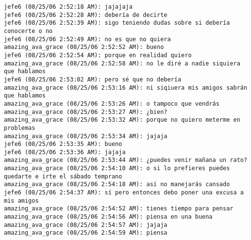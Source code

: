 \begin{verbatim}
jefe6 (08/25/06 2:52:18 AM): jajajaja
jefe6 (08/25/06 2:52:28 AM): debería de decirte
jefe6 (08/25/06 2:52:39 AM): sigo teniendo dudas sobre si debería conocerte o no
jefe6 (08/25/06 2:52:49 AM): no es que no quiera
amazing_ava_grace (08/25/06 2:52:52 AM): bueno
jefe6 (08/25/06 2:52:54 AM): porque en realidad quiero
amazing_ava_grace (08/25/06 2:52:58 AM): no le diré a nadie siquiera que hablamos
jefe6 (08/25/06 2:53:02 AM): pero sé que no debería
amazing_ava_grace (08/25/06 2:53:16 AM): ni siqiuera mis amigos sabrán que hablamos
amazing_ava_grace (08/25/06 2:53:26 AM): o tampoco que vendrás
amazing_ava_grace (08/25/06 2:53:27 AM): ¿bien?
amazing_ava_grace (08/25/06 2:53:32 AM): porque no quiero meterme en problemas
amazing_ava_grace (08/25/06 2:53:34 AM): jajaja
jefe6 (08/25/06 2:53:35 AM): bueno
jefe6 (08/25/06 2:53:36 AM): jajaja
amazing_ava_grace (08/25/06 2:53:44 AM): ¿puedes venir mañana un rato?
amazing_ava_grace (08/25/06 2:54:10 AM): o si lo prefieres puedes quedarte e irte el sábado temprano
amazing_ava_grace (08/25/06 2:54:18 AM): así no manejarás cansado
jefe6 (08/25/06 2:54:37 AM): sí pero entonces debo poner una excusa a mis amigos
amazing_ava_grace (08/25/06 2:54:52 AM): tienes tiempo para pensar
amazing_ava_grace (08/25/06 2:54:56 AM): piensa en una buena
amazing_ava_grace (08/25/06 2:54:57 AM): jajaja
amazing_ava_grace (08/25/06 2:54:59 AM): piensa
\end{verbatim}